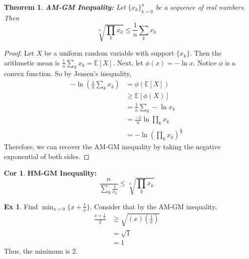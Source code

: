 \documentclass{article}
\newtheorem{theorem}{Theorem}
\theoremstyle{definition}\newtheorem{definition}{DEF}
\theoremstyle{definition}\newtheorem{example}{Ex}
\theoremstyle{lemma}\newtheorem{lemma}{Lemma}
\theoremstyle{corrolary}\newtheorem{corrolary}{Cor}
\begin{document}
\begin{theorem}
\textbf{AM-GM Inequality:}
Let $\{x_k\}_{k=0}^n$ be a sequence of real numbers.
Then
\begin{equation}
\sqrt[n]{\prod_k x_k}\leq \frac{1}{n}\sum_k x_k
\end{equation}
\end{theorem}
\begin{proof}
Let $X$ be a uniform random variable with support $\{x_k\}$.
Then the arithmetic mean is $\frac{1}{n}\sum_k x_k=\mathbb{E}[X]$.
Next, let $\phi(x)=-\ln x$.
Notice $\phi$ is a convex function.
So by Jensen's inequality,
\begin{align*}
-\ln \left( \frac{1}{n} \sum_k x_k \right) &= \phi(\mathbb{E}[X])\\
&\geq \mathbb{E}[\phi (X)]\\
&= \frac{1}{n}\sum_k -\ln x_k\\
&= \frac{-1}{n}\ln \prod_k x_k\\
&= -\ln \left(\prod_k x_k \right)^\frac{1}{n}
\end{align*}
Therefore, we can recover the AM-GM inequality by taking the negative exponential of both sides.
\end{proof}
\begin{corrolary}
\textbf{HM-GM Inequality:}
\begin{equation}
\frac{n}{\sum_k \frac{1}{x_k}}\leq \sqrt[n]{\prod_k x_k}
\end{equation}
\end{corrolary}

\begin{example}
Find $\min_{x>0}\{x+\frac{1}{x}\}$.
Consider that by the AM-GM inequality,
\begin{align*}
\frac{x+\frac{1}{x}}{2} &\geq \sqrt{(x)\left(\frac{1}{x}\right)}\\
&= \sqrt{1}\\
&=1
\end{align*}
Thus, the minimum is 2.
\end{example}
\end{document}
